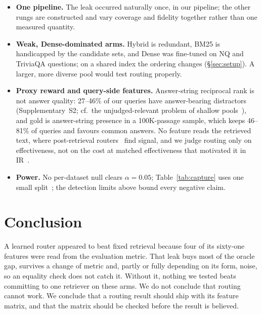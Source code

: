 \documentclass{article}
\begin{document}
\begin{itemize}\setlength{\itemsep}{1pt}\setlength{\parskip}{0pt}
  \item \textbf{One pipeline.} The leak occurred naturally once, in our pipeline; the other rungs
    are constructed and vary coverage and fidelity together rather than one measured quantity.
  \item \textbf{Weak, Dense-dominated arms.} Hybrid is redundant, BM25 is handicapped by the
    candidate sets, and Dense was fine-tuned on NQ and TriviaQA questions; on a shared index the
    ordering changes (\S\ref{sec:setup}). A larger, more diverse pool would test routing properly.
  \item \textbf{Proxy reward and query-side features.} Answer-string reciprocal rank is not answer
    quality: 27--46\% of our queries have answer-bearing distractors (Supplementary~S2; cf.\ the
    unjudged-relevant problem of shallow pools~\cite{arabzadeh2022shallow}), and gold is
    answer-string presence in a 100K-passage sample, which keeps 46--81\% of queries and favours
    common answers. No feature reads the retrieved text, where post-retrieval
    routers~\cite{qin2024ltrr,zhao2026r3ag,six2026ragcompass} find signal, and we judge routing
    only on effectiveness, not on the cost at matched effectiveness that motivated it in
    IR~\cite{arabzadeh2021bertselect}.
  \item \textbf{Power.} No per-dataset null clears $\alpha{=}0.05$; Table~\ref{tab:capture} uses one
    small split~\cite{fuhr2017mistakes}; the detection limits above bound every negative claim.
\end{itemize}

\section{Conclusion}

A learned router appeared to beat fixed retrieval because four of its sixty-one features were
read from the evaluation metric. That leak buys most of the oracle gap, survives a change of
metric and, partly or fully depending on its form, noise, so an equality check does not catch it.
Without it, nothing we tested beats committing to one retriever on these arms. We do not conclude
that routing cannot work. We conclude that a routing result should ship with its feature matrix,
and that the matrix should be checked before the result is believed.



\end{document}
